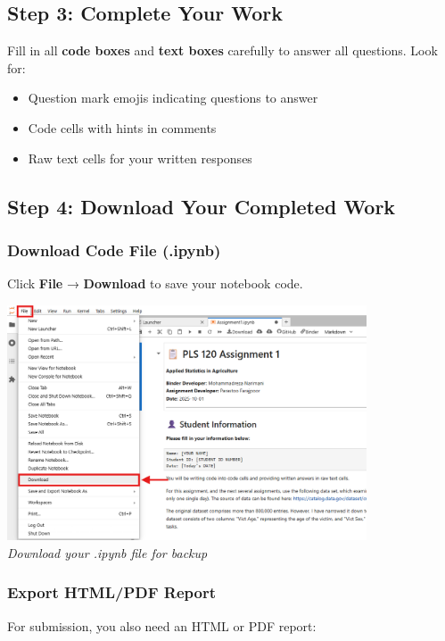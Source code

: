 \documentclass[11pt,a4paper]{article}
\begin{document}
\subsection{Step 3: Complete Your Work}

Fill in all \textbf{code boxes} and \textbf{text boxes} carefully to answer all questions. Look for:
\begin{itemize}
    \item Question mark emojis indicating questions to answer
    \item Code cells with hints in comments
    \item Raw text cells for your written responses
\end{itemize}

\subsection{Step 4: Download Your Completed Work}

\subsubsection{Download Code File (.ipynb)}

Click \textbf{File} → \textbf{Download} to save your notebook code.

\begin{center}
\includegraphics[width=0.8\textwidth]{../Image_9.png}\\
\textit{Download your .ipynb file for backup}
\end{center}

\subsubsection{Export HTML/PDF Report}

For submission, you also need an HTML or PDF report:
\end{document}
